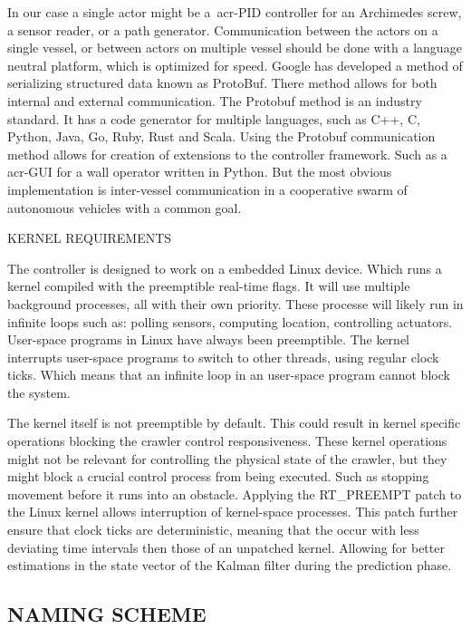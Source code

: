 In our case a single actor might be a~\gls{acr-PID} controller for an Archimedes screw, a sensor reader, or a
path generator. Communication between the actors on a single vessel, or between actors on multiple vessel should be done
with a language neutral platform, which is optimized for speed. Google has developed a method of serializing structured
data known as ProtoBuf. There method allows for both internal and external communication. The Protobuf method is an
industry standard. It has a code generator for multiple languages, such as C++, C, Python, Java, Go, Ruby, Rust and
Scala. Using the Protobuf communication method allows for creation of extensions to the controller framework. Such as a
\gls{acr-GUI} for a wall operator written in Python. But the most obvious implementation is inter-vessel
communication in a cooperative swarm of autonomous vehicles with a common goal.

\begin{RoyalNote}[label=Kernel_req]{KERNEL REQUIREMENTS}

The controller is designed to work on a embedded Linux device. Which runs a kernel compiled with the preemptible
real-time flags. It will use multiple background processes, all with their own priority. These processe will likely run
in infinite loops such as: polling sensors, computing location, controlling actuators. User-space programs in Linux have
always been preemptible. The kernel interrupts user-space programs to switch to other threads, using regular clock
ticks. Which means that an infinite loop in an user-space program cannot block the system.

The kernel itself is not preemptible by default. This could result in kernel specific operations blocking the crawler
control responsiveness. These kernel operations might not be relevant for controlling the physical state of the crawler,
but they might block a crucial control process from being executed. Such as stopping movement before it runs into an
obstacle. Applying the RT\_PREEMPT patch to the Linux kernel allows interruption of kernel-space processes. This patch
further ensure that clock ticks are deterministic, meaning that the occur with less deviating time intervals then those
of an unpatched kernel. Allowing for better estimations in the state vector of the Kalman filter during the prediction
phase.

\end{RoyalNote}

\subsection{NAMING SCHEME}\label{sec:naming scheme}

